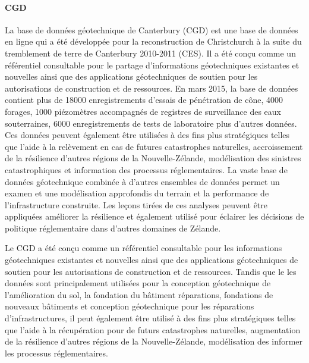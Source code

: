         \paragraph{CGD}
        La base de données géotechnique de Canterbury (CGD) est une base de données en ligne qui a été développée pour
        la reconstruction de Christchurch à la suite du tremblement de terre de Canterbury 2010-2011 (CES). Il
        a été conçu comme un référentiel consultable pour le partage d'informations géotechniques existantes et nouvelles
        ainsi que des applications géotechniques de soutien pour les autorisations de construction et de ressources. En mars
        2015, la base de données contient plus de 18000 enregistrements d'essais de pénétration de cône, 4000 forages, 1000
        piézomètres accompagnés de registres de surveillance des eaux souterraines, 6000 enregistrements de tests de laboratoire
        plus d'autres données. Ces données peuvent également être utilisées à des fins plus stratégiques telles que l'aide à la
        relèvement en cas de futures catastrophes naturelles, accroissement de la résilience d'autres régions de la Nouvelle-Zélande,
        modélisation des sinistres catastrophiques et information des processus réglementaires. La vaste base de données géotechnique
        combinée à d'autres ensembles de données permet un examen et une modélisation approfondis du terrain
        et la performance de l'infrastructure construite. Les leçons tirées de ces analyses peuvent être appliquées
        améliorer la résilience et également utilisé pour éclairer les décisions de politique réglementaire dans d'autres domaines de
        Zélande.
        \par
        Le CGD a été conçu comme un référentiel consultable pour les informations géotechniques existantes et nouvelles
        ainsi que des applications géotechniques de soutien pour les autorisations de construction et de ressources. Tandis que le
        les données sont principalement utilisées pour la conception géotechnique de l'amélioration du sol, la fondation du bâtiment
        réparations, fondations de nouveaux bâtiments et conception géotechnique pour les réparations d'infrastructures, il peut
        également être utilisé à des fins plus stratégiques telles que l'aide à la récupération pour de futurs
        catastrophes naturelles, augmentation de la résilience d'autres régions de la Nouvelle-Zélande, modélisation des
        informer les processus réglementaires.
        \cite{cgd}


